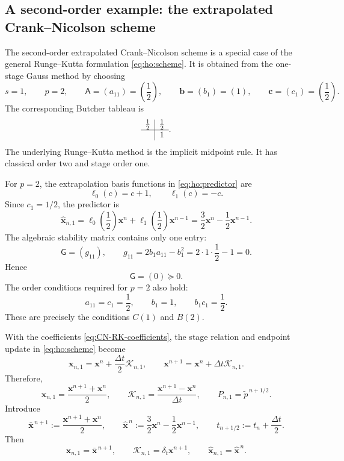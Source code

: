 \documentclass[11pt,a4paper]{article}
\newcommand{\bs}{\boldsymbol}
\newcommand{\dt}{\Delta t}
\newcommand{\pp}{\widetilde p}
\theoremstyle{definition}
\numberwithin{equation}{section}
\begin{document}
\subsection{A second-order example: the extrapolated Crank--Nicolson scheme}
\label{sec:CN}

The second-order extrapolated Crank--Nicolson scheme is a special case
of the general Runge--Kutta formulation \eqref{eq:ho:scheme}. It is
obtained from the one-stage Gauss method by choosing
\begin{equation}\label{eq:CN-RK-coefficients}
 s=1,\qquad
 p=2,\qquad
 \mathsf A=(a_{11})=\left(\frac12\right),\qquad
 \bs b=(b_1)=(1),\qquad
 \bs c=(c_1)=\left(\frac12\right).
\end{equation}
The corresponding Butcher tableau is
\begin{equation}\label{eq:CN-tableau}
\begin{array}{c|c}
\frac12&\frac12\\
\hline
&1
\end{array}.
\end{equation}
The underlying Runge--Kutta method is the implicit midpoint rule. It
has classical order two and stage order one.

For \(p=2\), the extrapolation basis functions in
\eqref{eq:ho:predictor} are
\[
 \ell_0(c)=c+1,
 \qquad
 \ell_1(c)=-c.
\]
Since \(c_1=1/2\), the predictor is
\begin{equation}\label{eq:CN-predictor-RK}
 \widehat{\bs x}_{n,1}
 =
 \ell_0\left(\frac12\right)\bs x^n
 +
 \ell_1\left(\frac12\right)\bs x^{n-1}
 =
 \frac32\bs x^n-\frac12\bs x^{n-1}.
\end{equation}
The algebraic stability matrix contains only one entry:
\begin{equation}\label{eq:CN-G}
 \mathsf G=(g_{11}),
 \qquad
 g_{11}
 =
 2b_1a_{11}-b_1^2
 =
 2\cdot1\cdot\frac12-1
 =
 0.
\end{equation}
Hence
\[
 \mathsf G=(0)\succeq0.
\]
The order conditions required for \(p=2\) also hold:
\[
 a_{11}=c_1=\frac12,
 \qquad
 b_1=1,
 \qquad
 b_1c_1=\frac12.
\]
These are precisely the conditions \(C(1)\) and \(B(2)\).

With the coefficients \eqref{eq:CN-RK-coefficients}, the stage relation
and endpoint update in \eqref{eq:ho:scheme} become
\[
 \bs x_{n,1}
 =
 \bs x^n+\frac{\dt}{2}\mathcal K_{n,1},
 \qquad
 \bs x^{n+1}
 =
 \bs x^n+\dt\mathcal K_{n,1}.
\]
Therefore,
\begin{equation}\label{eq:CN-stage-identification}
 \bs x_{n,1}
 =
 \frac{\bs x^{n+1}+\bs x^n}{2},
 \qquad
 \mathcal K_{n,1}
 =
 \frac{\bs x^{n+1}-\bs x^n}{\dt},
 \qquad
 P_{n,1}=\pp^{\,n+1/2}.
\end{equation}
Introduce
\begin{equation}\label{eq:CN-RK-notation}
 \bar{\bs x}^{\,n+1}
 :=
 \frac{\bs x^{n+1}+\bs x^n}{2},
 \qquad
 \widehat{\bs x}^{\,n}
 :=
 \frac32\bs x^n-\frac12\bs x^{n-1},
 \qquad
 t_{n+1/2}:=t_n+\frac{\dt}{2}.
\end{equation}
Then
\[
 \bs x_{n,1}=\bar{\bs x}^{\,n+1},
 \qquad
 \mathcal K_{n,1}=\delta_t\bs x^{n+1},
 \qquad
 \widehat{\bs x}_{n,1}=\widehat{\bs x}^{\,n}.
\]
\end{document}
